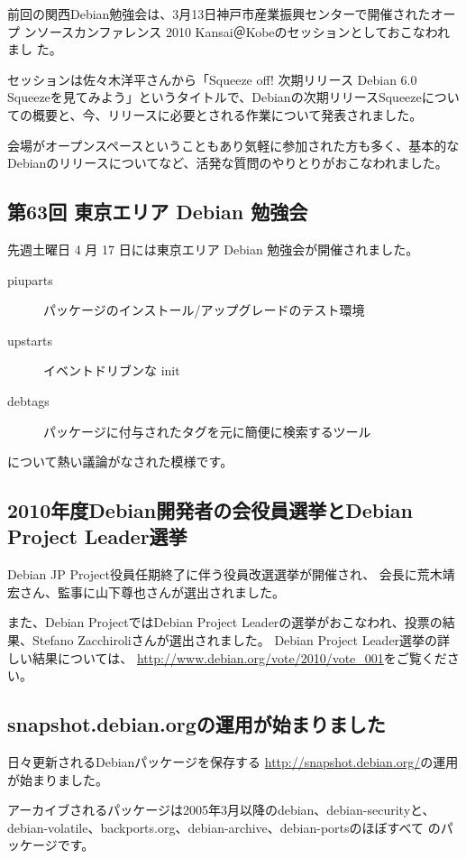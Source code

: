 \documentclass[mingoth,a4paper]{jsarticle}
\begin{document}
前回の関西Debian勉強会は、3月13日神戸市産業振興センターで開催されたオープ
ンソースカンファレンス 2010 Kansai＠Kobeのセッションとしておこなわれまし
た。

セッションは佐々木洋平さんから「Squeeze off! 次期リリース Debian 6.0
Squeezeを見てみよう」というタイトルで、Debianの次期リリースSqueezeについ
ての概要と、今、リリースに必要とされる作業について発表されました。

会場がオープンスペースということもあり気軽に参加された方も多く、基本的な
Debianのリリースについてなど、活発な質問のやりとりがおこなわれました。


\subsection{第63回 東京エリア Debian 勉強会}

先週土曜日 4 月 17 日には東京エリア Debian 勉強会が開催されました。
\begin{description}
      \item[piuparts] 
    パッケージのインストール/アップグレードのテスト環境
      \item[upstarts]
    イベントドリブンな init
      \item[debtags]
    パッケージに付与されたタグを元に簡便に検索するツール
\end{description}
について熱い議論がなされた模様です。


\subsection{2010年度Debian開発者の会役員選挙とDebian Project Leader選挙}
Debian JP Project役員任期終了に伴う役員改選選挙が開催され、
会長に荒木靖宏さん、監事に山下尊也さんが選出されました。

また、Debian ProjectではDebian Project Leaderの選挙がおこなわれ、投票の結
果、Stefano Zacchiroliさんが選出されました。
Debian Project Leader選挙の詳しい結果については、
\url{http://www.debian.org/vote/2010/vote_001}をご覧ください。

\subsection{snapshot.debian.orgの運用が始まりました}
日々更新されるDebianパッケージを保存する
\url{http://snapshot.debian.org/}の運用が始まりました。

アーカイブされるパッケージは2005年3月以降のdebian、debian-securityと、
debian-volatile、backports.org、debian-archive、debian-portsのほぼすべて
のパッケージです。
\end{document}
